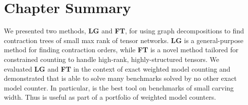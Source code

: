 \section{Chapter Summary} \label{sec:tensors:conclusion}
We presented two methods, \textbf{LG} and \textbf{FT}, for using graph decompositions to find contraction trees of small max rank of tensor networks. \textbf{LG} is a general-purpose method for finding contraction orders, while \textbf{FT} is a novel method tailored for constrained counting to handle high-rank, highly-structured tensors. We evaluated \textbf{LG} and \textbf{FT} in the context of exact weighted model counting and demonstrated that  is able to solve many benchmarks solved by no other exact model counter. In particular,  is the best tool on benchmarks of small carving width. Thus  is useful as part of a portfolio of weighted model counters. 





